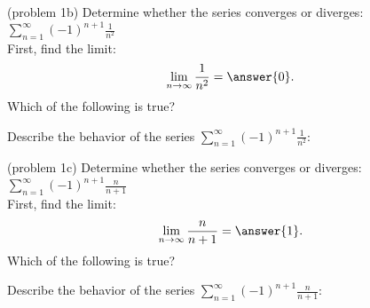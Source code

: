 \documentclass[handout]{ximera}
\begin{document}
\begin{problem}(problem 1b)
Determine whether the series converges or diverges: $\displaystyle{\sum_{n=1}^\infty (-1)^{n+1} \frac{1}{n^2}}$\\
First, find the limit:
\[
\lim_{n\to\infty} \frac{1}{n^2} = \answer{0}.
\]
Which of the following is true?
\begin{multipleChoice}
\end{multipleChoice}


Describe the behavior of the series $\displaystyle{\sum_{n=1}^\infty (-1)^{n+1} \frac{1}{n^2}:}$
\begin{multipleChoice}
\end{multipleChoice}

\end{problem}



\begin{problem}(problem 1c)
Determine whether the series converges or 
diverges: $\displaystyle{\sum_{n=1}^\infty (-1)^{n+1} \frac{n}{n+1}}$\\
First, find the limit:
\[
\lim_{n\to\infty} \frac{n}{n+1} = \answer{1}.
\]
Which of the following is true?
\begin{multipleChoice}
\end{multipleChoice}


Describe the behavior of the series $\displaystyle{\sum_{n=1}^\infty (-1)^{n+1} \frac{n}{n+1}:}$
\begin{multipleChoice}
\end{multipleChoice}

\end{problem}
\end{document}
